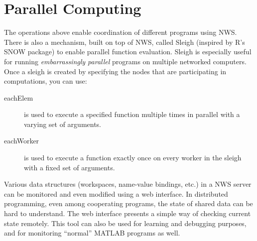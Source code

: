 \section{Parallel Computing}
The operations above enable coordination of different programs using
NWS. There is also a mechanism, built on top of NWS, called Sleigh
(inspired by R's SNOW package) to enable parallel function evaluation.
Sleigh is especially useful for running {\it embarrassingly parallel}
programs on multiple networked computers. Once a sleigh is created by
specifying the nodes that are participating in computations, you can
use:

\begin{description}
\item[eachElem] is used to execute a specified function multiple times
in parallel with a varying set of arguments.
\item[eachWorker] is used to execute a function exactly once on every
worker in the sleigh with a fixed set of arguments.
\end{description}

Various data structures (workspaces, name-value bindings, etc.) in a NWS
server can be monitored and even modified using a web interface. In
distributed programming, even among cooperating programs, the state of
shared data can be hard to understand. The web interface presents a
simple way of checking current state remotely. This tool can also be
used for learning and debugging purposes, and for monitoring ``normal''
MATLAB programs as well.
